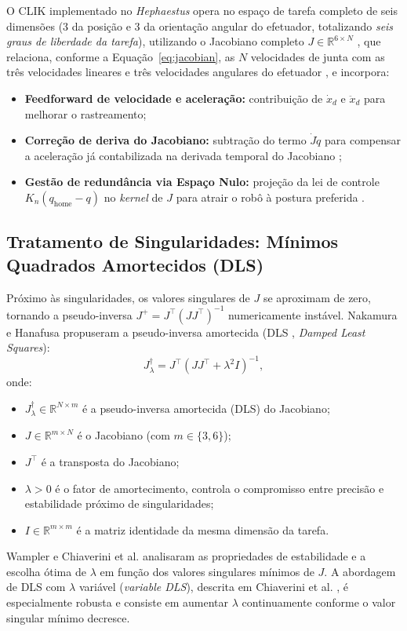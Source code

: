 O CLIK implementado no \textit{Hephaestus} opera no espaço de tarefa completo de seis dimensões (3 da posição e 3 da orientação angular do efetuador, totalizando \emph{seis graus de liberdade da tarefa}), utilizando o Jacobiano completo $J \in \mathbb{R}^{6 \times N}$ , que relaciona, conforme a Equação~\eqref{eq:jacobian}, as $N$ velocidades de junta com as três velocidades lineares e três velocidades angulares do efetuador , e incorpora:
\begin{itemize}
    \item \textbf{Feedforward de velocidade e aceleração:} contribuição de $\dot{x}_d$ e $\ddot{x}_d$ para melhorar o rastreamento;
    \item \textbf{Correção de deriva do Jacobiano:} subtração do termo $\dot{J}\dot{q}$ para compensar a aceleração já contabilizada na derivada temporal do Jacobiano \cite{siciliano2009robotics};
    \item \textbf{Gestão de redundância via Espaço Nulo:} projeção da lei de controle $K_n(q_{\text{home}} - q)$ no \textit{kernel} de $J$ para atrair o robô à postura preferida \cite{chiaverini1997singularity, liegeois1977automatic}.
\end{itemize}

\subsection{Tratamento de Singularidades: Mínimos Quadrados Amortecidos (DLS)}

Próximo às singularidades, os valores singulares de $J$ se aproximam de zero, tornando a pseudo-inversa $J^+ = J^\top(JJ^\top)^{-1}$ numericamente instável. Nakamura e Hanafusa \cite{nakamura1986inverse} propuseram a pseudo-inversa amortecida (DLS , \textit{Damped Least Squares}):
\begin{equation}
    J^{\dagger}_{\lambda} = J^\top\left(JJ^\top + \lambda^2 I\right)^{-1},
    \label{eq:dls}
\end{equation}
onde:
\begin{itemize}
    \item $J^{\dagger}_{\lambda} \in \mathbb{R}^{N\times m}$ é a pseudo-inversa amortecida (DLS) do Jacobiano;
    \item $J \in \mathbb{R}^{m\times N}$ é o Jacobiano (com $m \in \{3, 6\}$);
    \item $J^\top$ é a transposta do Jacobiano;
    \item $\lambda > 0$ é o fator de amortecimento, controla o compromisso entre precisão e estabilidade próximo de singularidades;
    \item $I \in \mathbb{R}^{m\times m}$ é a matriz identidade da mesma dimensão da tarefa.
\end{itemize} Wampler \cite{wampler2007manipulator} e Chiaverini et al. \cite{chiaverini1994review} analisaram as propriedades de estabilidade e a escolha ótima de $\lambda$ em função dos valores singulares mínimos de $J$. A abordagem de DLS com $\lambda$ variável (\textit{variable DLS}), descrita em Chiaverini et al. \cite{chiaverini1994review}, é especialmente robusta e consiste em aumentar $\lambda$ continuamente conforme o valor singular mínimo decresce.

